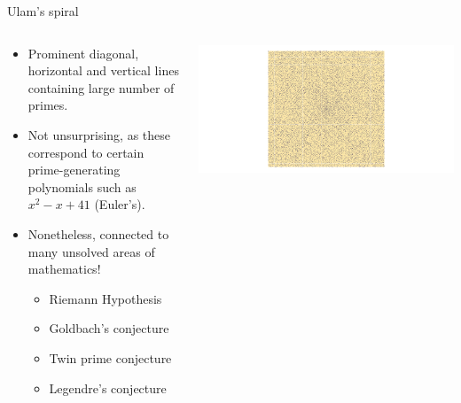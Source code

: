 \documentclass[,aspectratio=169]{beamer}
\providecommand{\tightlist}{%
  \setlength{\itemsep}{0pt}\setlength{\parskip}{0pt}}
\begin{document}
\begin{frame}{Ulam's spiral}
\protect\hypertarget{ulams-spiral}{}
\begin{columns}[T]
\begin{column}{0.4\textwidth}
\begin{itemize}
\item
  Prominent diagonal, horizontal and vertical lines containing large
  number of primes.
\item
  Not unsurprising, as these correspond to certain prime-generating
  polynomials such as \(x^2 - x + 41\) (Euler's).
\item
  Nonetheless, connected to many unsolved areas of mathematics!

  \begin{itemize}
  \tightlist
  \item
    Riemann Hypothesis
  \item
    Goldbach's conjecture
  \item
    Twin prime conjecture
  \item
    Legendre's conjecture
  \end{itemize}
\end{itemize}
\end{column}

\begin{column}{0.6\textwidth}
\vspace{-2em}

\begin{center}\includegraphics[height=0.9\textheight]{figure/unnamed-chunk-3-1} \end{center}
\end{column}
\end{columns}
\end{frame}
\end{document}
